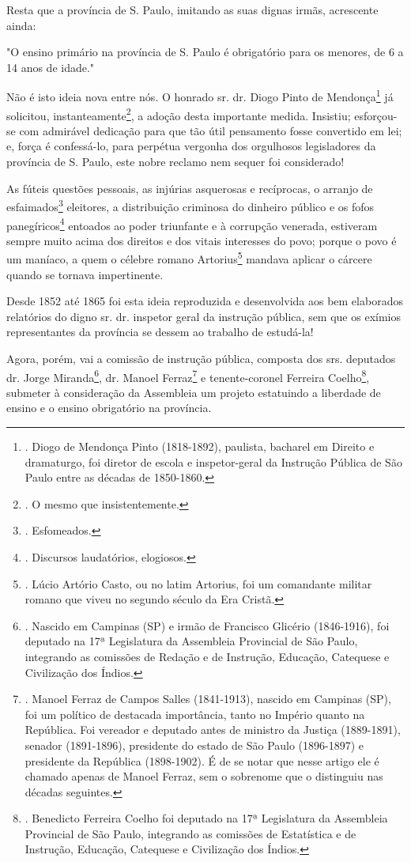 Resta que a província de S. Paulo, imitando as suas dignas irmãs,
acrescente ainda:

"O ensino primário na província de S. Paulo é obrigatório para os
menores, de 6 a 14 anos de idade."

Não é isto ideia nova entre nós. O honrado sr. dr. Diogo Pinto de
Mendonça\footnote{. Diogo de Mendonça Pinto (1818-1892), paulista,
  bacharel em Direito e dramaturgo, foi diretor de escola e
  inspetor-geral da Instrução Pública de São Paulo entre as décadas de
  1850-1860.} já solicitou, instanteamente\footnote{. O mesmo que
  insistentemente.}, a adoção desta importante medida. Insistiu;
esforçou-se com admirável dedicação para que tão útil pensamento fosse
convertido em lei; e, força é confessá-lo, para perpétua vergonha dos
orgulhosos legisladores da província de S. Paulo, este nobre reclamo nem
sequer foi considerado!

As fúteis questões pessoais, as injúrias asquerosas e recíprocas, o
arranjo de esfaimados\footnote{. Esfomeados.} eleitores, a distribuição
criminosa do dinheiro público e os fofos panegíricos\footnote{.
  Discursos laudatórios, elogiosos.} entoados ao poder triunfante e à
corrupção venerada, estiveram sempre muito acima dos direitos e dos
vitais interesses do povo; porque o povo é um maníaco, a quem o célebre
romano Artorius\footnote{. Lúcio Artório Casto, ou no latim Artorius,
  foi um comandante militar romano que viveu no segundo século da Era
  Cristã.} mandava aplicar o cárcere quando se tornava impertinente.

Desde 1852 até 1865 foi esta ideia reproduzida e desenvolvida aos bem
elaborados relatórios do digno sr. dr. inspetor geral da instrução
pública, sem que os exímios representantes da província se dessem ao
trabalho de estudá-la!

Agora, porém, vai a comissão de instrução pública, composta dos srs.
deputados dr. Jorge Miranda\footnote{. Nascido em Campinas (SP) e irmão
  de Francisco Glicério (1846-1916), foi deputado na 17ª Legislatura da
  Assembleia Provincial de São Paulo, integrando as comissões de Redação
  e de Instrução, Educação, Catequese e Civilização dos Índios.}, dr.
Manoel Ferraz\footnote{. Manoel Ferraz de Campos Salles (1841-1913),
  nascido em Campinas (SP), foi um político de destacada importância,
  tanto no Império quanto na República. Foi vereador e deputado antes de
  ministro da Justiça (1889-1891), senador (1891-1896), presidente do
  estado de São Paulo (1896-1897) e presidente da República (1898-1902).
  É de se notar que nesse artigo ele é chamado apenas de Manoel Ferraz,
  sem o sobrenome que o distinguiu nas décadas seguintes.} e
tenente-coronel Ferreira Coelho\footnote{. Benedicto Ferreira Coelho foi
  deputado na 17ª Legislatura da Assembleia Provincial de São Paulo,
  integrando as comissões de Estatística e de Instrução, Educação,
  Catequese e Civilização dos Índios.}, submeter à consideração da
Assembleia um projeto estatuindo a liberdade de ensino e o ensino
obrigatório na província.

